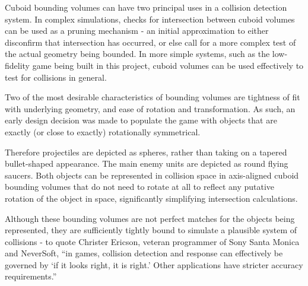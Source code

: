 \documentclass{article}
\begin{document}
Cuboid bounding volumes can have two principal uses in a collision detection system. In complex simulations,
checks for intersection between cuboid volumes can be used as a pruning mechanism - an initial approximation
to either disconfirm that intersection has occurred, or else call for a more complex test of the actual
geometry being bounded. In more simple systems, such as the low-fidelity game being built in this project,
cuboid volumes can be used effectively to test for collisions in general.\cite[p. 75]{ericson}

Two of the most desirable characteristics of bounding volumes are tightness of fit with underlying geometry,
and ease of rotation and transformation.\cite[p. 76]{ericson} As such, an early design decision was made to
populate the game with objects that are exactly (or close to exactly) rotationally symmetrical.

Therefore projectiles are depicted as spheres, rather than taking on a tapered bullet-shaped appearance. The main
enemy units are depicted as round flying saucers. Both objects can be represented in collision space in
axis-aligned cuboid bounding volumes that do not need to rotate at all to reflect any putative rotation of
the object in space, significantly simplifying intersection calculations.

Although these bounding volumes are not perfect matches for the objects being represented, they are sufficiently
tightly bound to simulate a plausible system of collisions - to quote Christer Ericson, veteran programmer of Sony
Santa Monica and NeverSoft, ``in games, collision detection and response can effectively be governed by `if it looks
right, it is right.' Other applications have stricter accuracy requirements.''\cite[p. 12]{ericson}
\end{document}
